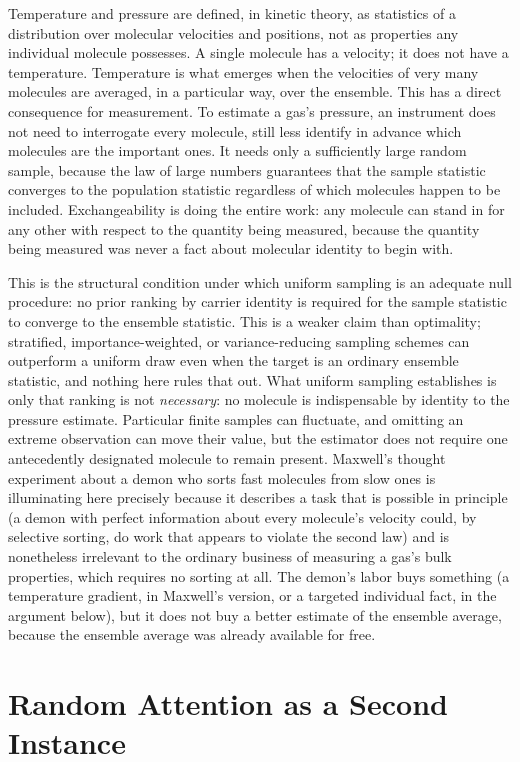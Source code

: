 \documentclass[11pt]{article}
\begin{document}
Temperature and pressure are defined, in kinetic theory, as statistics of a distribution over molecular velocities and positions, not as properties any individual molecule possesses. A single molecule has a velocity; it does not have a temperature. Temperature is what emerges when the velocities of very many molecules are averaged, in a particular way, over the ensemble. This has a direct consequence for measurement. To estimate a gas's pressure, an instrument does not need to interrogate every molecule, still less identify in advance which molecules are the important ones. It needs only a sufficiently large random sample, because the law of large numbers guarantees that the sample statistic converges to the population statistic regardless of which molecules happen to be included. Exchangeability is doing the entire work: any molecule can stand in for any other with respect to the quantity being measured, because the quantity being measured was never a fact about molecular identity to begin with.

This is the structural condition under which uniform sampling is an adequate null procedure: no prior ranking by carrier identity is required for the sample statistic to converge to the ensemble statistic. This is a weaker claim than optimality; stratified, importance-weighted, or variance-reducing sampling schemes can outperform a uniform draw even when the target is an ordinary ensemble statistic, and nothing here rules that out. What uniform sampling establishes is only that ranking is not \emph{necessary}: no molecule is indispensable by identity to the pressure estimate. Particular finite samples can fluctuate, and omitting an extreme observation can move their value, but the estimator does not require one antecedently designated molecule to remain present. Maxwell's thought experiment about a demon who sorts fast molecules from slow ones is illuminating here precisely because it describes a task that is possible in principle (a demon with perfect information about every molecule's velocity could, by selective sorting, do work that appears to violate the second law) and is nonetheless irrelevant to the ordinary business of measuring a gas's bulk properties, which requires no sorting at all. The demon's labor buys something (a temperature gradient, in Maxwell's version, or a targeted individual fact, in the argument below), but it does not buy a better estimate of the ensemble average, because the ensemble average was already available for free.

\section{Random Attention as a Second Instance}
\end{document}
